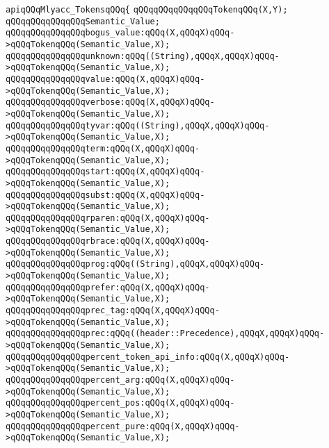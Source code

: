 \label{src/app/yacc/src/yacc.grammar.api}
\verb|apiqQQqMlyacc_TokensqQQq{|\newline
\verb|qQQqqQQqqQQqqQQqTokenqQQq(X,Y);|\newline
\verb|qQQqqQQqqQQqqQQqSemantic_Value;|\newline
\verb|qQQqqQQqqQQqqQQqbogus_value:qQQq(X,qQQqX)qQQq->qQQqTokenqQQq(Semantic_Value,X);|\newline
\verb|qQQqqQQqqQQqqQQqunknown:qQQq((String),qQQqX,qQQqX)qQQq->qQQqTokenqQQq(Semantic_Value,X);|\newline
\verb|qQQqqQQqqQQqqQQqvalue:qQQq(X,qQQqX)qQQq->qQQqTokenqQQq(Semantic_Value,X);|\newline
\verb|qQQqqQQqqQQqqQQqverbose:qQQq(X,qQQqX)qQQq->qQQqTokenqQQq(Semantic_Value,X);|\newline
\verb|qQQqqQQqqQQqqQQqtyvar:qQQq((String),qQQqX,qQQqX)qQQq->qQQqTokenqQQq(Semantic_Value,X);|\newline
\verb|qQQqqQQqqQQqqQQqterm:qQQq(X,qQQqX)qQQq->qQQqTokenqQQq(Semantic_Value,X);|\newline
\verb|qQQqqQQqqQQqqQQqstart:qQQq(X,qQQqX)qQQq->qQQqTokenqQQq(Semantic_Value,X);|\newline
\verb|qQQqqQQqqQQqqQQqsubst:qQQq(X,qQQqX)qQQq->qQQqTokenqQQq(Semantic_Value,X);|\newline
\verb|qQQqqQQqqQQqqQQqrparen:qQQq(X,qQQqX)qQQq->qQQqTokenqQQq(Semantic_Value,X);|\newline
\verb|qQQqqQQqqQQqqQQqrbrace:qQQq(X,qQQqX)qQQq->qQQqTokenqQQq(Semantic_Value,X);|\newline
\verb|qQQqqQQqqQQqqQQqprog:qQQq((String),qQQqX,qQQqX)qQQq->qQQqTokenqQQq(Semantic_Value,X);|\newline
\verb|qQQqqQQqqQQqqQQqprefer:qQQq(X,qQQqX)qQQq->qQQqTokenqQQq(Semantic_Value,X);|\newline
\verb|qQQqqQQqqQQqqQQqprec_tag:qQQq(X,qQQqX)qQQq->qQQqTokenqQQq(Semantic_Value,X);|\newline
\verb|qQQqqQQqqQQqqQQqprec:qQQq((header::Precedence),qQQqX,qQQqX)qQQq->qQQqTokenqQQq(Semantic_Value,X);|\newline
\verb|qQQqqQQqqQQqqQQqpercent_token_api_info:qQQq(X,qQQqX)qQQq->qQQqTokenqQQq(Semantic_Value,X);|\newline
\verb|qQQqqQQqqQQqqQQqpercent_arg:qQQq(X,qQQqX)qQQq->qQQqTokenqQQq(Semantic_Value,X);|\newline
\verb|qQQqqQQqqQQqqQQqpercent_pos:qQQq(X,qQQqX)qQQq->qQQqTokenqQQq(Semantic_Value,X);|\newline
\verb|qQQqqQQqqQQqqQQqpercent_pure:qQQq(X,qQQqX)qQQq->qQQqTokenqQQq(Semantic_Value,X);|\newline
